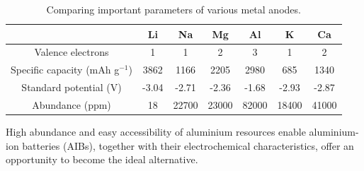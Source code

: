\begin{table}[tbh!]
\caption{Comparing important parameters of various metal anodes.} \label{table2}
\begin{tabular}{|ccccccc|}
\hline
 & \textbf{Li} & \textbf{Na} & \textbf{Mg} & \textbf{Al} & \textbf{K} & \textbf{Ca}\\
\hline
\hline
Valence electrons & 1 & 1 & 2 & 3 & 1 & 2\\
Specific capacity (mAh g$^{-1}$) & 3862 & 1166 & 2205 & 2980 & 685 & 1340\\
Standard potential (V) & -3.04 & -2.71 & -2.36  & -1.68 & -2.93 & -2.87\\
Abundance (ppm) & 18 & 22700 & 23000 & 82000 & 18400 & 41000\\
\hline  %
\end{tabular}
\end{table}

High abundance and easy accessibility of aluminium resources enable aluminium-ion batteries (AIBs), together with their electrochemical characteristics, offer an opportunity to become the ideal alternative.

